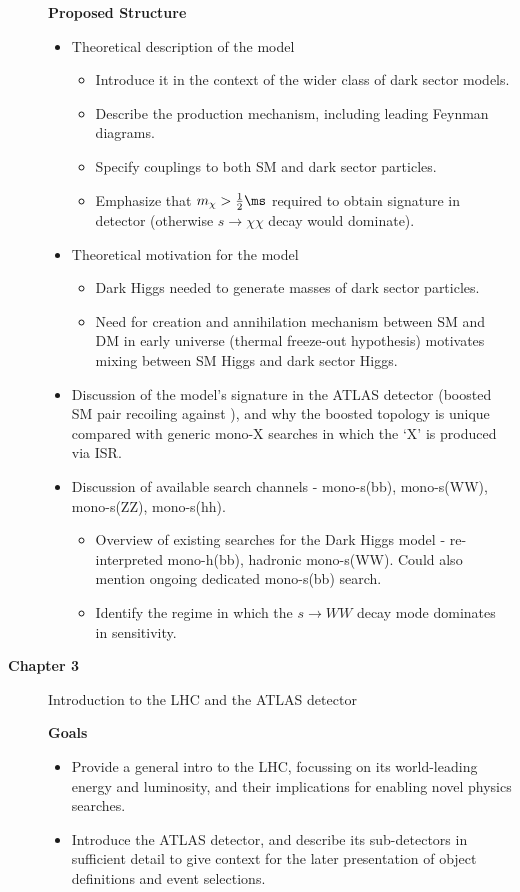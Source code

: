 \begin{description}
\textbf{Proposed Structure}
\begin{itemize}
\item Theoretical description of the model
\begin{itemize}
\item Introduce it in the context of the wider class of dark sector models.
\item Describe the production mechanism, including leading Feynman diagrams.
\item Specify couplings to both SM and dark sector particles. 
\item Emphasize that $m_\chi>\frac{1}{2}\ms$ required to obtain signature in detector (otherwise $s\rightarrow\chi\chi$ decay would dominate).
\end{itemize}
\item Theoretical motivation for the model
\begin{itemize}
\item Dark Higgs needed to generate masses of dark sector particles.
\item Need for creation and annihilation mechanism between SM and DM in early universe (thermal freeze-out hypothesis) motivates mixing between SM Higgs and dark sector Higgs.
\end{itemize}
\item Discussion of the model's signature in the ATLAS detector (boosted SM pair recoiling against \met), and why the boosted topology is unique compared with generic mono-X searches in which the `X' is produced via ISR.
\item Discussion of available search channels - mono-s(bb), mono-s(WW), mono-s(ZZ), mono-s(hh).
\begin{itemize}
\item Overview of existing searches for the Dark Higgs model - re-interpreted mono-h(bb), hadronic mono-s(WW). Could also mention ongoing dedicated mono-s(bb) search.
\item Identify the \ms regime in which the $s\rightarrow WW$ decay mode dominates in sensitivity.
\end{itemize}
\end{itemize}

\item[\textbf{Chapter 3}] Introduction to the LHC and the ATLAS detector

\textbf{Goals}
\begin{itemize}
\item Provide a general intro to the LHC, focussing on its world-leading energy and luminosity, and their implications for enabling novel physics searches.
\item Introduce the ATLAS detector, and describe its sub-detectors in sufficient detail to give context for the later presentation of object definitions and event selections. 
\end{itemize}


\end{description}
